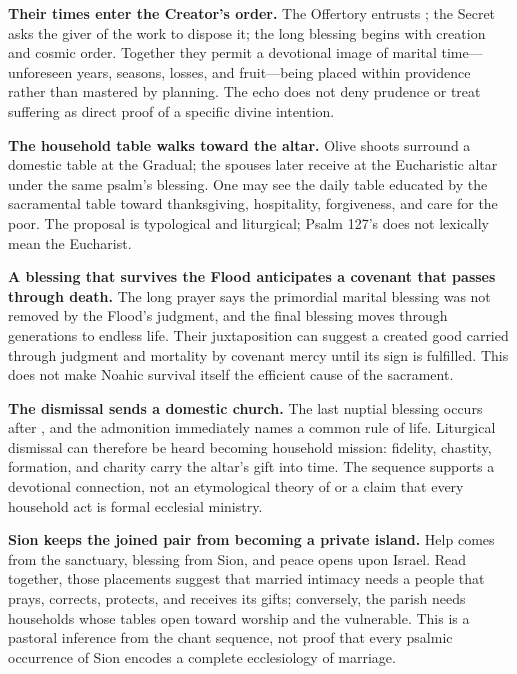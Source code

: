 \begin{deepstudy}
\noindent\textbf{Their times enter the Creator's order.\enspace{}}
The Offertory entrusts ; the Secret asks the giver of the work to dispose it; the long blessing begins with creation and cosmic order. Together they permit a devotional image of marital time---unforeseen years, seasons, losses, and fruit---being placed within providence rather than mastered by planning. The echo does not deny prudence or treat suffering as direct proof of a specific divine intention.

\noindent\textbf{The household table walks toward the altar.\enspace{}}
Olive shoots surround a domestic table at the Gradual; the spouses later receive at the Eucharistic altar under the same psalm's blessing. One may see the daily table educated by the sacramental table toward thanksgiving, hospitality, forgiveness, and care for the poor. The proposal is typological and liturgical; Psalm 127's  does not lexically mean the Eucharist.

\noindent\textbf{A blessing that survives the Flood anticipates a covenant that passes through death.\enspace{}}
The long prayer says the primordial marital blessing was not removed by the Flood's judgment, and the final blessing moves through generations to endless life. Their juxtaposition can suggest a created good carried through judgment and mortality by covenant mercy until its sign is fulfilled. This does not make Noahic survival itself the efficient cause of the sacrament.

\noindent\textbf{The dismissal sends a domestic church.\enspace{}}
The last nuptial blessing occurs after , and the admonition immediately names a common rule of life. Liturgical dismissal can therefore be heard becoming household mission: fidelity, chastity, formation, and charity carry the altar's gift into time. The sequence supports a devotional connection, not an etymological theory of  or a claim that every household act is formal ecclesial ministry.

\noindent\textbf{Sion keeps the joined pair from becoming a private island.\enspace{}}
Help comes from the sanctuary, blessing from Sion, and peace opens upon Israel. Read together, those placements suggest that married intimacy needs a people that prays, corrects, protects, and receives its gifts; conversely, the parish needs households whose tables open toward worship and the vulnerable. This is a pastoral inference from the chant sequence, not proof that every psalmic occurrence of Sion encodes a complete ecclesiology of marriage.


\end{deepstudy}
